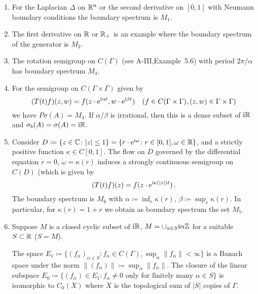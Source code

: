 \begin{examples}\label{ex:b3-2.6}%

\begin{enumerate}[\upshape (i), wide, labelindent=.5em]
\item
For the Laplacian $\Delta$ on $\mathbb{R}^{n}$ or the second derivative on $[0,1]$ with Neumann boundary conditions the boundary spectrum is $M_{1}$.
	
\item
The first derivative on $\mathbb{R}$ or $\mathbb{R}_{+}$ is an example where the boundary spectrum of the generator is $M_{2}$.
	
\item
The rotation semigroup on $C(\Gamma)$ (see A-III,Example~5.6) with period $2\pi/\alpha$ has boundary spectrum $M_{3}$.

\item
For the semigroup on $C(\Gamma \times \Gamma)$ given by
	\[
	(T(t)f)(z,w) = f(z\cdot \mathrm{e}^{\mathrm{i}\alpha t},w\cdot \mathrm{e}^{\mathrm{i}\beta  t}) \quad (f \in C(\Gamma \times \Gamma), (z,w) \in \Gamma \times \Gamma)
	\]
	we have $P\sigma(A) = M_{4}$.
	If $\alpha/\beta$ is irrational, then this is a dense subset of $\mathrm{i} \mathbb{R}$ and $\sigma_{b}(A) = \sigma(A) = \mathrm{i}\mathbb{R}$.
	
\item
Consider $D \coloneqq \{z \in \mathbb{C} \colon |z| \leq 1\} = \{r\cdot \mathrm{e}^{\mathrm{i}\omega} \colon r \in [0,1], \omega \in \mathbb{R}\}$, and a strictly positive function $\kappa \in C[0,1]$.
	The flow on $D$ governed by the differential equation $\dot{r} = 0$, $\dot{\omega} = \kappa(r)$ induces a strongly continuous semigroup on $C(D)$ (which is given by
	\[
	(T(t)f)(z) = f(z\cdot \mathrm{e}^{\mathrm{i}\kappa(|z|)t})\,.
	\]
	The boundary spectrum is $M_{6}$ with $\alpha \coloneqq \inf_r \kappa(r)$, $\beta \coloneqq \sup_r \kappa(r)$.
	In particular, for $\kappa(r) = 1 + r$ we obtain as boundary spectrum the set $M_{5}$.
	
\item
Suppose $M$ is a closed cyclic subset of $\mathrm{i} \mathbb{R}$, $M = \cup_{\alpha \in S} \mathrm{i}\alpha\mathbb{Z}$ for a suitable $S \subset \mathbb{R}$ (\eg $S = M$).
	
	The space $E_{1} \coloneqq \{(f_{\alpha})_{\alpha \in S} \colon f_{\alpha} \in C(\Gamma), \sup_\alpha \|f_{\alpha}\| < \infty\}$ is a Banach space under the norm $\|(f_{\alpha})\| \coloneqq \sup_\alpha \|f_{\alpha}\|$.
	The closure of the linear subspace $E_{0} \coloneqq \{(f_{\alpha}) \in E_{1} \colon f_{\alpha} \neq 0 \text{ only for finitely many } \alpha \in S\}$ is isomorphic to $C_{0}(X)$ where $X$ is the topological sum of $|S|$ copies of $\Gamma$.
	

\end{enumerate}
\end{examples}
